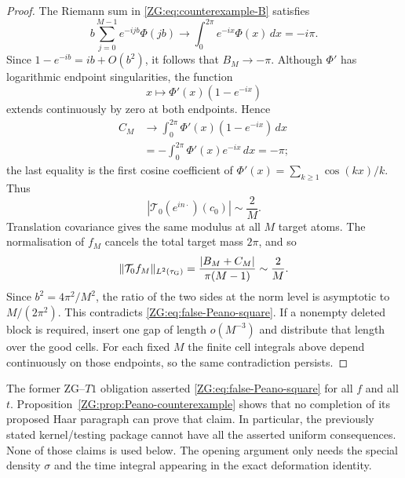 \begin{proof}
The Riemann sum in \eqref{ZG:eq:counterexample-B} satisfies
\[
 b\sum_{j=0}^{M-1}e^{-ijb}\Phi(jb)
 \longrightarrow\int_0^{2\pi}e^{-ix}\Phi(x)\,dx=-i\pi.
\]
Since $1-e^{-ib}=ib+O(b^2)$, it follows that $B_M\to-\pi$.
Although $\Phi'$ has logarithmic endpoint singularities, the function
\[
 x\longmapsto\Phi'(x)(1-e^{-ix})
\]
extends continuously by zero at both endpoints.  Hence
\begin{align*}
 C_M&\longrightarrow
 \int_0^{2\pi}\Phi'(x)(1-e^{-ix})\,dx\\
 &= -\int_0^{2\pi}\Phi'(x)e^{-ix}\,dx=-\pi;
\end{align*}
the last equality is the first cosine coefficient of
$\Phi'(x)=\sum_{k\ge1}\cos(kx)/k$.  Thus
\begin{equation}\label{ZG:eq:counterexample-asymptotic}
 |\mathcal T_0(e^{in\cdot})(c_0)|\sim\frac2M.
\end{equation}
Translation covariance gives the same modulus at all $M$ target atoms.
The normalisation of $f_M$ cancels the total target mass $2\pi$, and so
\[
 \|\mathcal T_0f_M\|_{L^2(\tau_{\rm G})}
 =\frac{|B_M+C_M|}{\pi(M-1)}\sim\frac2M.
\]
Since $b^2=4\pi^2/M^2$, the ratio of the two sides at the norm level is
asymptotic to $M/(2\pi^2)$.  This contradicts
\eqref{ZG:eq:false-Peano-square}.  If a nonempty deleted block is required,
insert one gap of length $o(M^{-3})$ and distribute that length over the
good cells.  For each fixed $M$ the finite cell integrals above depend
continuously on those endpoints, so the same contradiction persists.
\end{proof}

\begin{remark}
The former ZG--$T1$ obligation asserted \eqref{ZG:eq:false-Peano-square} for
all $f$ and all $t$.  Proposition~\ref{ZG:prop:Peano-counterexample} shows
that no completion of its proposed Haar paragraph can prove that claim.
In particular, the previously stated kernel/testing package cannot have
all the asserted uniform consequences.  None of those claims is used
below.  The opening argument only needs the special density $\sigma$ and
the time integral appearing in the exact deformation identity.
\end{remark}

